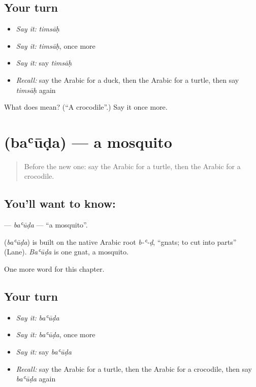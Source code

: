 \subsection*{Your turn}
\begin{itemize}
\raggedright
  \item \emph{Say it:} \emph{timsāḥ}
  \item \emph{Say it:} \emph{timsāḥ}, once more
  \item \emph{Say it:} say \emph{timsāḥ}
  \item \emph{Recall:} say the Arabic for a duck, then the Arabic for a turtle, then say \emph{timsāḥ} again
\end{itemize}

\begin{tcolorbox}[breakable,colback=teal!4,colframe=teal!35!black,title={Before you move on}]
What does  mean? (\textquotedblleft{}A crocodile\textquotedblright{}.) Say it once more.
\end{tcolorbox}
\section[\texorpdfstring{\ar{بعوضة} (baʿūḍa)}{بعوضة (baʿūḍa)}]{ (baʿūḍa) — a mosquito}

\label{lesson:AR-C136-bauda}



\begin{quote}
Before the new one: say the Arabic for a turtle, then the Arabic for a crocodile.
\end{quote}

\subsection*{You'll want to know: }
\textbf{} — \emph{baʿūḍa} — \textquotedblleft{}a mosquito\textquotedblright{}.

\begin{cousinweb}
\textbf{} (\emph{baʿūḍa}) is built on the native Arabic root \emph{b-ʿ-ḍ}, \textquotedblleft{}gnats; to cut into parts\textquotedblright{} (Lane). \emph{Baʿūḍa} is one gnat, a mosquito.
\end{cousinweb}

\begin{grammarlens}[title={What you've built}]
One more word for this chapter.
\end{grammarlens}

\subsection*{Your turn}
\begin{itemize}
\raggedright
  \item \emph{Say it:} \emph{baʿūḍa}
  \item \emph{Say it:} \emph{baʿūḍa}, once more
  \item \emph{Say it:} say \emph{baʿūḍa}
  \item \emph{Recall:} say the Arabic for a turtle, then the Arabic for a crocodile, then say \emph{baʿūḍa} again
\end{itemize}

